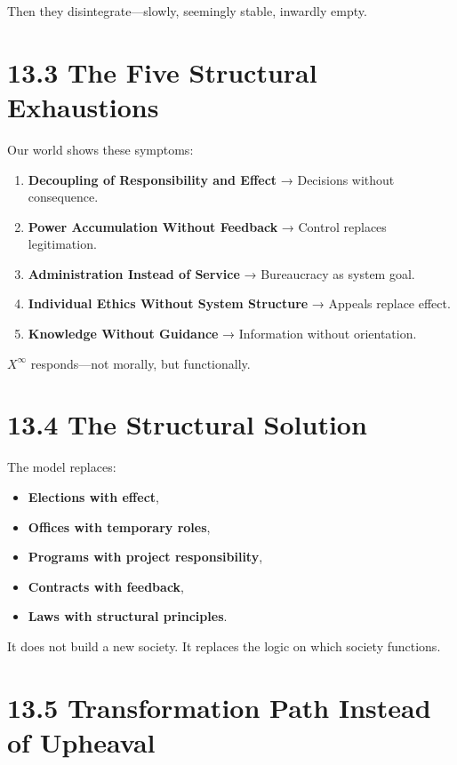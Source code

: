 \documentclass[12pt,a4paper]{book}
\begin{document}
Then they disintegrate—slowly, seemingly stable, inwardly empty.

\section*{13.3 The Five Structural Exhaustions}

Our world shows these symptoms:

\begin{enumerate}
    \item \textbf{Decoupling of Responsibility and Effect}  
    → Decisions without consequence.

    \item \textbf{Power Accumulation Without Feedback}  
    → Control replaces legitimation.

    \item \textbf{Administration Instead of Service}  
    → Bureaucracy as system goal.

    \item \textbf{Individual Ethics Without System Structure}  
    → Appeals replace effect.

    \item \textbf{Knowledge Without Guidance}  
    → Information without orientation.
\end{enumerate}

$X^\infty$ responds—not morally, but functionally.

\section*{13.4 The Structural Solution}

The model replaces:

\begin{itemize}
    \item \textbf{Elections with effect},
    \item \textbf{Offices with temporary roles},
    \item \textbf{Programs with project responsibility},
    \item \textbf{Contracts with feedback},
    \item \textbf{Laws with structural principles}.
\end{itemize}

It does not build a new society.  
It replaces the logic on which society functions.

\section*{13.5 Transformation Path Instead of Upheaval}
\end{document}

